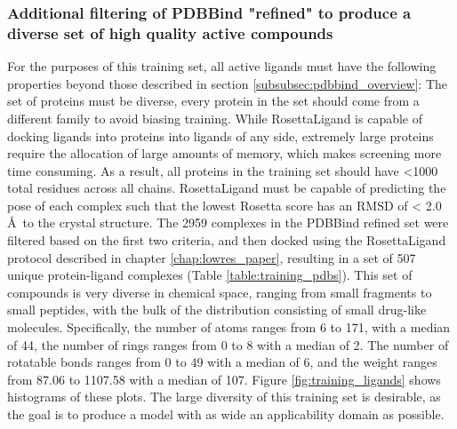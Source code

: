 \subsubsection{Additional filtering of PDBBind "refined" to produce a diverse set of high quality active compounds}
\label{subsubsec:active_poses}
For the purposes of this training set, all active ligands must have the following properties beyond those described in section \ref{subsubsec:pdbbind_overview}:
The set of proteins must be diverse, every protein in the set should come from a different family to avoid biasing training.
While RosettaLigand is capable of docking ligands into proteins into ligands of any side, extremely large proteins require the allocation of large amounts of memory, which makes screening more time consuming.
As a result, all proteins in the training set should have <1000 total residues across all chains.
RosettaLigand must be capable of predicting the pose of each complex such that the lowest Rosetta score has an \ac{RMSD} of < 2.0 \AA\ to the crystal structure.
The 2959 complexes in the PDBBind refined set were filtered based on the first two criteria, and then docked using the RosettaLigand protocol described in chapter \ref{chap:lowres_paper}, resulting in a set of 507 unique protein-ligand complexes (Table \ref{table:training_pdbs}). 
This set of compounds is very diverse in chemical space, ranging from small fragments to small peptides, with the bulk of the distribution consisting of small drug-like molecules.
Specifically, the number of atoms ranges from 6 to 171, with a median of 44, the number of rings ranges from 0 to 8 with a median of 2. The number of rotatable bonds ranges from 0 to 49 with a median of 6, and the weight ranges from 87.06 to 1107.58 with a median of 107.
Figure \ref{fig:training_ligands} shows histograms of these plots.
The large diversity of this training set is desirable, as the goal is to produce a model with as wide an applicability domain as possible.

